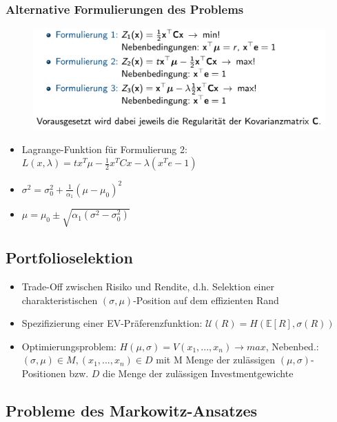 \documentclass[12pt]{report}
\theoremstyle{dotless}
\theoremstyle{definition}
\begin{document}
\subsubsection{Alternative Formulierungen des Problems}

\begin{figure}[H]
\centering
\includegraphics[width=\textwidth]{Bilder/alternativeFormulierungen.png}
\end{figure}

\begin{itemize}
	\item Lagrange-Funktion f\"ur Formulierung 2: \\ $L(x, \lambda) = tx^T \mu - \frac{1}{2} x^T Cx - \lambda (x^T e - 1)$ 
	\item $\sigma^2 = \sigma_0^2 + \frac{1}{\alpha_1}(\mu - \mu_0)^2$
	\item $\mu = \mu_0 \pm \sqrt{\alpha_1 (\sigma^2 - \sigma_0^2) }$
\end{itemize}



\subsection{Portfolioselektion}

\begin{itemize}
	\item Trade-Off zwischen Risiko und Rendite, d.h. Selektion einer charakteristischen $(\sigma, \mu)$-Position auf dem effizienten Rand
	\item Spezifizierung einer EV-Pr\"aferenzfunktion: $\mathcal{U}(R)=H(\mathbb{E}[R], \sigma(R))$
	\item Optimierungsproblem: $H(\mu, \sigma) = V(x_1,...,x_n) \rightarrow max$, Nebenbed.: $(\sigma, \mu) \in M, (x_1,...,x_n) \in D$ mit M Menge der zul\"assigen $(\mu, \sigma)$-Positionen bzw. $D$ die Menge der zul\"assigen Investmentgewichte
\end{itemize}

\subsection{Probleme des Markowitz-Ansatzes}
\end{document}
